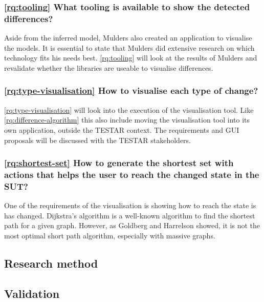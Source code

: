 \subsubsection{\ref{rq:tooling} What tooling is available to show the detected differences?}
Aside from the inferred model, Mulders also created an application to visualise the models. It is essential to state that Mulders did extensive research on which technology fits his needs best. \ref{rq:tooling} will look at the results of Mulders and revalidate whether the libraries are useable to visualise differences. 

\subsubsection{\ref{rq:type-visualisation} How to visualise each type of change?}
\ref{rq:type-visualisation} will look into the execution of the visualisation tool. Like \ref{rq:difference-algorithm} this also include moving the visualisation tool into its own application, outside the TESTAR context. The requirements and GUI proposals will be discussed with the TESTAR stakeholders. 

\subsubsection{\ref{rq:shortest-set} How to generate the shortest set with actions that helps the user to reach the changed state in the SUT?}
One of the requirements of the visualisation is showing how to reach the state is has changed. Dijkstra's algorithm \cite{dijkstra1959note} is a well-known algorithm to find the shortest path for a given graph. However, as Goldberg and Harrelson \cite{goldberg2005computing} showed, it is not the most optimal short path algorithm, especially with massive graphs. 


    \subsection{Research method}
    
        
        
    \subsection{Validation}
    

    